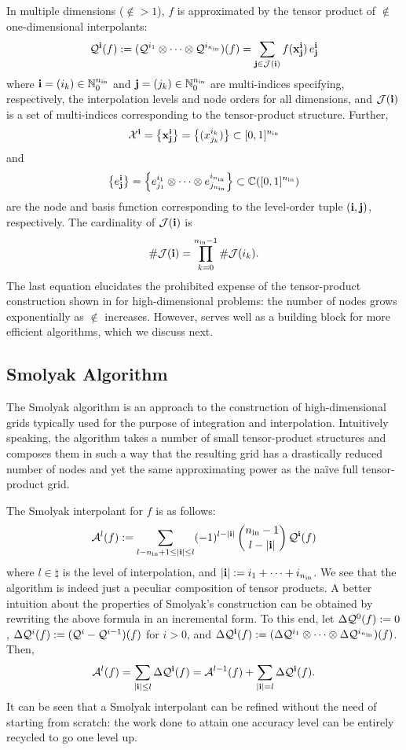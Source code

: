 In multiple dimensions ($\nin > 1$), $f$ is approximated by the tensor product
of $\nin$ one-dimensional interpolants:
\begin{equation} \elab{tensor-product}
  \tensor{\vi}(f) := (\tensor{i_1} \otimes \cdots \otimes \tensor{i_\nin})(f) = \sum_{\vj \in \index(\vi)} f(\v{x}^\vi_\vj) \, \e^\vi_\vj
\end{equation}
where $\mathbf{i} = (i_k) \in \mathbb{N}_0^{n_\text{in}}$ and $\mathbf{j} = (j_k) \in \mathbb{N}_0^{n_\text{in}}$ are
multi-indices specifying, respectively, the interpolation levels and node orders
for all dimensions, and $\mathcal{J}(\mathbf{i})$ is a set of multi-indices corresponding to
the tensor-product structure. Further,
\[
  \mathcal{X}^{\mathbf{i}} = \left\{ \mathbf{x}^{\mathbf{i}}_{\mathbf{j}} \right\} = \left\{ (x^{i_k}_{j_k}) \right\} \subset [0, 1]^{n_\text{in}}
\]
and
\[
  \left\{ e^{\mathbf{i}}_{\mathbf{j}} \right\} = \left\{ e^{i_1}_{j_1} \otimes \cdots \otimes e^{i_{n_\text{in}}}_{j_{n_\text{in}}} \right\} \subset \mathbb{C}([0, 1]^{n_\text{in}})
\]
are the node and basis function corresponding to the level-order tuple $(\mathbf{i},
\mathbf{j})$, respectively. The cardinality of $\mathcal{J}(\mathbf{i})$ is
\[
  \# \mathcal{J}(\mathbf{i}) = \prod_{k = 0}^{{n_\text{in}} - 1} \# \mathcal{J}(i_k).
\]
The last equation elucidates the prohibited expense of the tensor-product
construction shown in  for high-dimensional problems: the
number of nodes grows exponentially as $\nin$ increases. However,
 serves well as a building block for more efficient
algorithms, which we discuss next.

\subsection{Smolyak Algorithm}
The Smolyak algorithm is an approach to the construction of high-dimensional
grids typically used for the purpose of integration and interpolation.
Intuitively speaking, the algorithm takes a number of small tensor-product
structures and composes them in such a way that the resulting grid has a
drastically reduced number of nodes and yet the same approximating power as the
na\"{i}ve full tensor-product grid.

The Smolyak interpolant for $f$ is as follows:
\[
  \mathcal{A}^{l}(f) := \sum_{l - {n_\text{in}} + 1 \leq |\mathbf{i}| \leq l} (-1)^{l - |\mathbf{i}|} \, {{n_\text{in}} - 1 \choose l - |\mathbf{i}|} \, \mathcal{Q}^{\mathbf{i}}(f)
\]
where $l \in \natural$ is the level of interpolation, and $|\mathbf{i}| := i_1 + \dots
+ i_{n_\text{in}}$. We see that the algorithm is indeed just a peculiar composition of
tensor products. A better intuition about the properties of Smolyak's
construction can be obtained by rewriting the above formula in an incremental
form. To this end, let $\Delta \mathcal{Q}^{0}(f) := 0$, $\Delta \mathcal{Q}^{i}(f) :=
(\mathcal{Q}^{i} - \mathcal{Q}^{i - 1})(f)$ for $i > 0$, and $\Delta \mathcal{Q}^{\mathbf{i}}(f) :=
(\Delta \mathcal{Q}^{i_1} \otimes \cdots \otimes \Delta \mathcal{Q}^{i_{n_\text{in}}})(f)$. Then,
\[
  \mathcal{A}^{l}(f) = \sum_{|\mathbf{i}| \leq l} \Delta \mathcal{Q}^{\mathbf{i}}(f) = \mathcal{A}^{l - 1}(f) + \sum_{|\mathbf{i}| = l} \Delta \mathcal{Q}^{\mathbf{i}}(f).
\]
It can be seen that a Smolyak interpolant can be refined without the need of
starting from scratch: the work done to attain one accuracy level can be
entirely recycled to go one level up.

